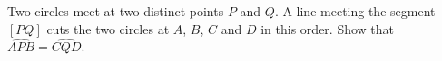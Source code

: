 Two circles meet at two distinct points $P$ and $Q$. A line meeting the segment $[PQ]$ cuts the two circles at $A$, $B$, $C$ and $D$ in this order. Show that $\widehat{APB} = \widehat{CQD}$.

